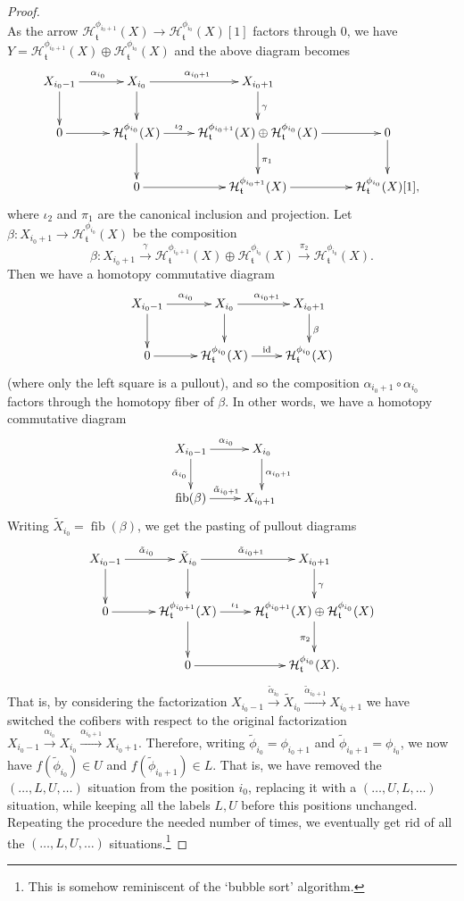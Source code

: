 \documentclass{article}
\theoremstyle{definition}
\newcommand{\tee}{\mathfrak{t}}
\DeclareMathOperator{\fib}{fib}
\begin{document}
\begin{proof}
\[{}
\]
As the arrow $\mathcal{H}^{\phi_{i_0+1}}_{\tee}(X)\to \mathcal{H}^{\phi_{i_0}}_{\tee}(X)[1]$ factors through $0$, we have $Y=\mathcal{H}^{\phi_{i_0+1}}_{\tee}(X)\oplus \mathcal{H}^{\phi_{i_0}}_{\tee}(X)$ and the above diagram becomes
\[
\xymatrix{X_{i_0-1}\ar[r]^{\alpha_{i_0}}\ar[d] & X_{i_0}\ar[r]^{\alpha_{i_0+1}}\ar[d] & X_{i_0+1}\ar[d]^{\gamma}\\
0\ar[r]&\mathcal{H}^{\phi_{i_0}}_{\tee}(X)\ar[d]\ar[r]^-{\iota_2}&\mathcal{H}^{\phi_{i_0+1}}_{\tee}(X)\oplus \mathcal{H}^{\phi_{i_0}}_{\tee}(X)\ar[d]^{\pi_1}\ar[r] &0\ar[d]\\
&0\ar[r]&\mathcal{H}^{\phi_{i_0+1}}_{\tee}(X)\ar[r]&\mathcal{H}^{\phi_{i_0}}_{\tee}(X)[1],
}
\]
where $\iota_2$ and $\pi_1$ are the canonical inclusion and projection. Let $\beta\colon X_{i_0+1}\to \mathcal{H}^{\phi_{i_0}}_{\tee}(X)$ be the composition
\[
\beta\colon X_{i_0+1}\xrightarrow{\gamma} \mathcal{H}^{\phi_{i_0+1}}_{\tee}(X)\oplus \mathcal{H}^{\phi_{i_0}}_{\tee}(X)\xrightarrow{\pi_2} 
\mathcal{H}^{\phi_{i_0}}_{\tee}(X).
\]
Then we have a homotopy commutative diagram
\[
\xymatrix{
X_{i_0-1}\ar[r]^{\alpha_{i_0}}\ar[d]&X_{i_0}\ar[r]^{\alpha_{i_0+1}}\ar[d] & X_{i_0+1}\ar[d]^{\beta}\\
0\ar[r]&\mathcal{H}^{\phi_{i_0}}_{\tee}(X)\ar[r]^-{\mathrm{id}}&\mathcal{H}^{\phi_{i_0}}_{\tee}(X)
}
\]
(where only the left square is a pullout), and so the composition $\alpha_{i_0+1}\circ \alpha_{i_0}$ factors through the homotopy fiber of $\beta$. In other words, we have a homotopy commutative diagram
\[
\xymatrix{
X_{i_0-1}\ar[r]^{\alpha_{i_0}}\ar[d]_{\tilde{\alpha}_{i_0}}&X_{i_0}\ar[d]^{\alpha_{i_0+1}}\\
\fib(\beta)\ar[r]^{\tilde{\alpha}_{i_0+1}}&X_{i_0+1}\
}
\]
Writing $\tilde{X}_{i_0}=\fib(\beta)$, we get the pasting of pullout diagrams
\[
\xymatrix{X_{i_0-1}\ar[r]^{\tilde{\alpha}_{i_0}}\ar[d] & \tilde{X}_{i_0}\ar[r]^{\tilde{\alpha}_{i_0+1}}\ar[d] & X_{i_0+1}\ar[d]^{\gamma}\\
0\ar[r]&\mathcal{H}^{\phi_{i_0+1}}_{\tee}(X)\ar[d]\ar[r]^-{\iota_1}&\mathcal{H}^{\phi_{i_0+1}}_{\tee}(X)\oplus \mathcal{H}^{\phi_{i_0}}_{\tee}(X)\ar[d]_{\pi_2}\\
&0\ar[r]&\mathcal{H}^{\phi_{i_0}}_{\tee}(X).
}
\]
That is, by considering the factorization $X_{i_0-1}\xrightarrow{\tilde{\alpha}_{i_0}} \tilde{X}_{i_0}\xrightarrow{\tilde{\alpha}_{i_0+1}} X_{i_0+1}$ we have switched the cofibers with respect to the original factorization $X_{i_0-1}\xrightarrow{{\alpha}_{i_0}} {X}_{i_0}\xrightarrow{{\alpha}_{i_0+1}} X_{i_0+1}$. Therefore, writing $\tilde{\phi}_{i_0}=\phi_{i_0+1}$ and $\tilde{\phi}_{i_0+1}=\phi_{i_0}$, 
we now have  $f(\tilde{\phi}_{i_0})\in U$ and $f(\tilde{\phi}_{i_0+1})\in L$. That is, we have removed the $(\dots,L,U,\dots)$ situation from the position $i_0$, replacing it with a $(\dots,U,L,\dots)$ situation, while keeping all the labels $L,U$ before this positions unchanged. Repeating the procedure the needed number of times, we eventually get rid of all the $(\dots,L,U,\dots)$ situations.\footnote{This is somehow reminiscent of the `bubble sort' algorithm.}
\end{proof}
\end{document}
